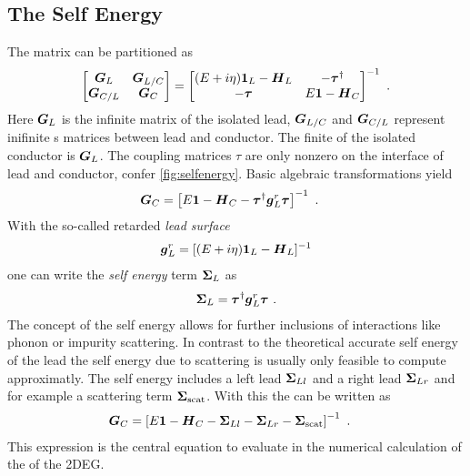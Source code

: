 \subsection{The Self Energy}
The \gfnc{} matrix can be partitioned as
\begin{align}
  \begin{bmatrix}
  \boldsymbol{G}_{L} & \boldsymbol{G}_{L/C}\\
  \boldsymbol{G}_{C/L} & \boldsymbol{G}_{C}
  \end{bmatrix}
  =
  \begin{bmatrix}
  (E+i\eta)\boldsymbol{1}_{L} - \boldsymbol{H}_L  & -\boldsymbol{\tau}^{\dagger} \\
	-\boldsymbol{\tau} & E\boldsymbol{1} - \boldsymbol{H}_C
  \end{bmatrix}^{-1}\ .
  \label{eqn:greendivided}
\end{align}
Here $\boldsymbol{G}_L$ is the infinite \gfnc{} matrix of the isolated lead, $\boldsymbol{G}_{L/C}$ and $\boldsymbol{G}_{C/L}$ represent inifinite \gfnc s matrices between lead and conductor. The finite \gfnc{} of the isolated conductor is $\boldsymbol{G}_L$. The coupling matrices $\tau$ are only nonzero on the interface of lead and conductor, confer \cref{fig:selfenergy}.
Basic algebraic transformations yield \cite{Datta1997}
\begin{align}
\boldsymbol{G}_C& = \left[E\boldsymbol{1}-\boldsymbol{H}_C -\boldsymbol{\tau}^{\dagger} \boldsymbol{g}_L^r \boldsymbol{\tau} \right]^{-1} \ .
\label{eqn:finitegreensfunction}
\end{align}
With the so-called retarded \emph{lead surface \gfnc{}}
\begin{align}
\boldsymbol{g}_L^r = [(E+i\eta)\boldsymbol{1}_L - \boldsymbol{H}_L]^{-1}
\label{eqn:leadsurfacegfnc}
\end{align}
one can write the \emph{self energy} term $\boldsymbol{\Sigma}_L$ as
\begin{align}
\boldsymbol{\Sigma}_L = \boldsymbol{\tau}^{\dagger} \boldsymbol{g}_L^r \boldsymbol{\tau}\ .
\label{eqn:sigmal}
\end{align}
The concept of the self energy allows for further inclusions of interactions like phonon or impurity scattering. In contrast to the theoretical accurate self energy of the lead the self energy due to scattering is usually only feasible to compute approximatly. The self energy includes a left lead $\boldsymbol{\Sigma}_{Ll}$ and a right lead $\boldsymbol{\Sigma}_{Lr}$ and for example a scattering term $\boldsymbol{\Sigma}_{\text{scat}}$. With this the \gfnc{} can be written as
\begin{align}
\boldsymbol{G}_C& = \left[E\boldsymbol{1}-\boldsymbol{H}_C -\boldsymbol{\Sigma}_{Ll}-\boldsymbol{\Sigma}_{Lr}-\boldsymbol{\Sigma}_{\text{scat}} \right]^{-1} \ .
\label{eqn:finitegreensfunctionwithselfenergy}
\end{align}
This expression is the central equation to evaluate in the numerical calculation of the \gfnc{} of the 2DEG. 
